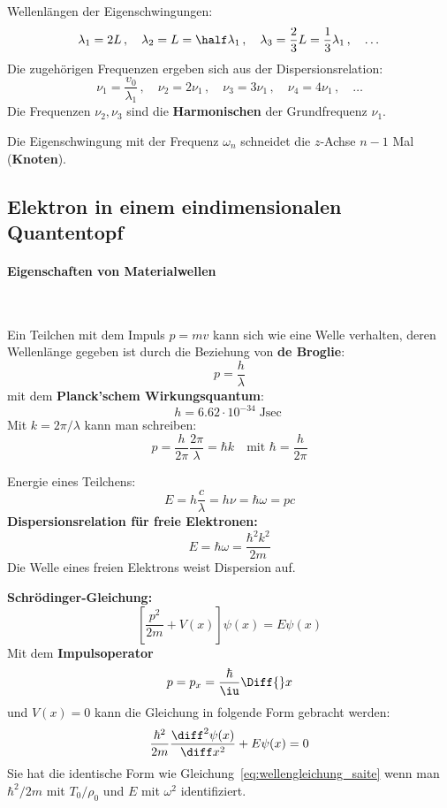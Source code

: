 			Wellenlängen der Eigenschwingungen:
			\[
				\lambda_1 = 2L\,,\quad
				\lambda_2 = L = \half \lambda_1\,,\quad
				\lambda_3 = \frac 2 3 L = \frac 1 3 \lambda_1\,,\quad \dots
			\]
			Die zugehörigen Frequenzen ergeben sich aus der Dispersionsrelation:
			\[
				\nu_1 = \frac{v_0}{\lambda_1}\,,\quad
				\nu_2 = 2\nu_1\,,\quad
				\nu_3 = 3\nu_1\,,\quad
				\nu_4 = 4\nu_1\,,\quad \dots
			\]
			Die Frequenzen $\nu_2, \nu_3$ sind die \textbf{Harmonischen} der Grundfrequenz $\nu_1$.
			
			Die Eigenschwingung mit der Frequenz $\omega_n$ schneidet die $z$-Achse $n-1$ Mal (\textbf{Knoten}).
	\subsection{Elektron in einem eindimensionalen Quantentopf} %
		\paragraph{Eigenschaften von Materialwellen} %
			~
			
			Ein Teilchen mit dem Impuls $p = mv$ kann sich wie eine Welle verhalten, deren Wellenlänge gegeben ist durch die Beziehung von \textbf{de Broglie}:
			\[
				p = \frac h \lambda
			\]
			mit dem \textbf{Planck'schem Wirkungsquantum}:
			\[
				h = 6.62\cdot 10^{-34} \si{\joule\sec}
			\]
			Mit $k = 2 \pi / \lambda$ kann man schreiben:
			\[
				p = \frac h {2\pi} \frac {2\pi}{\lambda} = \hbar k \quad \text{mit } \hbar = \frac h {2\pi}
			\]
			
			Energie eines Teilchens:
			\[
				E = h \frac c \lambda = h \nu = \hbar \omega = p c
			\]
			\textbf{Dispersionsrelation für freie Elektronen:}
			\[
				E = \hbar \omega = \frac{\hbar^2 k^2}{2m}
			\]
			Die Welle eines freien Elektrons weist Dispersion auf.
			
			\textbf{Schrödinger-Gleichung:}
			\[
				\left[
					\frac{p^2}{2m} + V(x)
				\right] \psi(x) = E \psi(x)
			\]
			Mit dem \textbf{Impulsoperator}
			\[
				p = p_x = \frac \hbar \iu \Diff{} x
			\]
			und $V(x) = 0$ kann die Gleichung in folgende Form gebracht werden:
			\[
				\frac{\hbar^2}{2m} \frac{\diff^2\psi(x)}{\diff x^2} + E\psi(x) = 0
			\]
			Sie hat die identische Form wie Gleichung~\eqref{eq:wellengleichung_saite} wenn man $\hbar^2/2m$ mit $T_0/\rho_0$ und $E$ mit $\omega^2$ identifiziert.
			
